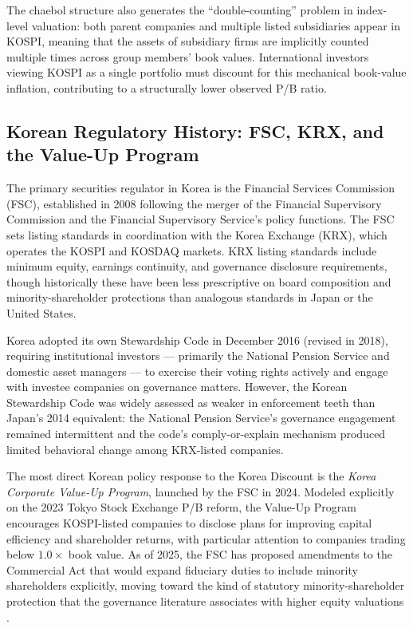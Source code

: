 \documentclass[12pt]{article}
\begin{document}
The chaebol structure also generates the ``double-counting'' problem in index-level
valuation: both parent companies and multiple listed subsidiaries appear in KOSPI, meaning
that the assets of subsidiary firms are implicitly counted multiple times across group
members' book values. International investors viewing KOSPI as a single portfolio must
discount for this mechanical book-value inflation, contributing to a structurally lower
observed P/B ratio.

\subsection{Korean Regulatory History: FSC, KRX, and the Value-Up Program}

The primary securities regulator in Korea is the Financial Services Commission (FSC),
established in 2008 following the merger of the Financial Supervisory Commission and the
Financial Supervisory Service's policy functions. The FSC sets listing standards in
coordination with the Korea Exchange (KRX), which operates the KOSPI and KOSDAQ markets.
KRX listing standards include minimum equity, earnings continuity, and governance
disclosure requirements, though historically these have been less prescriptive on board
composition and minority-shareholder protections than analogous standards in Japan or
the United States.

Korea adopted its own Stewardship Code in December 2016 (revised in 2018), requiring
institutional investors --- primarily the National Pension Service and domestic asset managers
--- to exercise their voting rights actively and engage with investee companies on governance
matters. However, the Korean Stewardship Code was widely assessed as weaker in enforcement
teeth than Japan's 2014 equivalent: the National Pension Service's governance engagement
remained intermittent and the code's comply-or-explain mechanism produced limited behavioral
change among KRX-listed companies.

The most direct Korean policy response to the Korea Discount is the \textit{Korea Corporate
Value-Up Program}, launched by the FSC in 2024. Modeled explicitly on the 2023 Tokyo Stock
Exchange P/B reform, the Value-Up Program encourages KOSPI-listed companies to disclose plans
for improving capital efficiency and shareholder returns, with particular attention to companies
trading below $1.0\times$ book value. As of 2025, the FSC has proposed amendments to the
Commercial Act that would expand fiduciary duties to include minority shareholders explicitly,
moving toward the kind of statutory minority-shareholder protection that the governance
literature associates with higher equity valuations \citep{porta1998, porta2002}.
\end{document}
